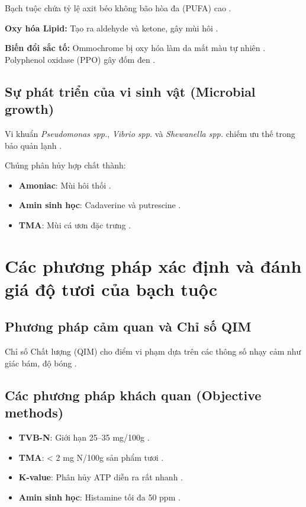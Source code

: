 \documentclass[12pt,a4paper]{report}
\begin{document}
Bạch tuộc chứa tỷ lệ axit béo không bão hòa đa (PUFA) cao \cite{mdpi_fatty_acid}.

\textbf{Oxy hóa Lipid:} Tạo ra aldehyde và ketone, gây mùi hôi \cite{mdpi_antioxidant}. 

\textbf{Biến đổi sắc tố:} Ommochrome bị oxy hóa làm da mất màu tự nhiên \cite{pubmed_ice_storage}. Polyphenol oxidase (PPO) gây đốm đen \cite{pubmed_ppo}.

\subsection{Sự phát triển của vi sinh vật (Microbial growth)}

Vi khuẩn \textit{Pseudomonas spp.}, \textit{Vibrio spp.} và \textit{Shewanella spp.} chiếm ưu thế trong bảo quản lạnh \cite{researchgate_sensory_scheme}.

Chúng phân hủy hợp chất thành:
\begin{itemize}
    \item \textbf{Amoniac}: Mùi hôi thối \cite{researchgate_sensory_scheme}.
    \item \textbf{Amin sinh học}: Cadaverine và putrescine \cite{pmc_biogenic_amines}.
    \item \textbf{TMA}: Mùi cá ươn đặc trưng \cite{pmc_biogenic_squid}.
\end{itemize}

\section{Các phương pháp xác định và đánh giá độ tươi của bạch tuộc}

\subsection{Phương pháp cảm quan và Chỉ số QIM}

Chỉ số Chất lượng (QIM) cho điểm vi phạm dựa trên các thông số nhạy cảm như giác bám, độ bóng \cite{researchgate_sensory_scheme}.

\subsection{Các phương pháp khách quan (Objective methods)}

\begin{itemize}
    \item \textbf{TVB-N}: Giới hạn 25–35 mg/100g \cite{researchgate_tvbn_hake}.
    \item \textbf{TMA}: < 2 mg N/100g sản phẩm tươi \cite{researchgate_sensory_scheme}.
    \item \textbf{K-value}: Phân hủy ATP diễn ra rất nhanh \cite{researchgate_atp}.
    \item \textbf{Amin sinh học}: Histamine tối đa 50 ppm \cite{pmc_biogenic_amines}.
\end{itemize}
\end{document}
